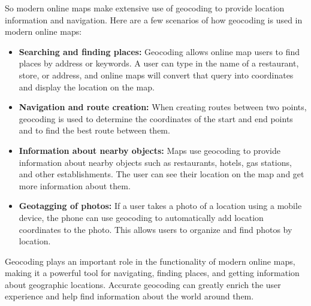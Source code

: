 \documentclass[10pt,oneside,english,a4paper]{article}
\begin{document}
So modern online maps make extensive use of geocoding to provide location information and navigation. Here are a few scenarios of how geocoding is used in modern online maps:

\begin{itemize}
\item \textbf{Searching and finding places:} Geocoding allows online map users to find places by address or keywords. A user can type in the name of a restaurant, store, or address, and online maps will convert that query into coordinates and display the location on the map.
\item \textbf{Navigation and route creation:} When creating routes between two points, geocoding is used to determine the coordinates of the start and end points and to find the best route between them.
\item \textbf{Information about nearby objects:} Maps use geocoding to provide information about nearby objects such as restaurants, hotels, gas stations, and other establishments. The user can see their location on the map and get more information about them.
\item \textbf{Geotagging of photos:} If a user takes a photo of a location using a mobile device, the phone can use geocoding to automatically add location coordinates to the photo. This allows users to organize and find photos by location.
\end{itemize}

Geocoding plays an important role in the functionality of modern online maps, making it a powerful tool for navigating, finding places, and getting information about geographic locations. Accurate geocoding can greatly enrich the user experience and help find information about the world around them. 
\end{document}
